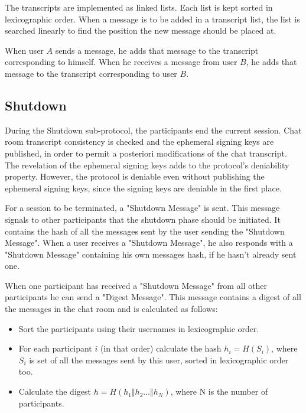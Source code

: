 The transcripts are implemented as linked lists. Each list is kept sorted in lexicographic order.
When a message is to be added in a transcript list, the list is searched linearly to find the position the new message should be placed at.

When user $A$ sends a message, he adds that message to the transcript corresponding to himself.
When he receives a message from user $B$, he adds that message to the transcript corresponding to user $B$.

\subsection{Shutdown}
\label{subsections:shutdown}

\begin{algorithm}[p]
  
\end{algorithm}

During the Shutdown sub-protocol, the participants end the current session. Chat room transcript consistency is checked and the ephemeral signing keys are published, in order to permit a posteriori modifications of the chat transcript. The revelation of the ephemeral signing keys adds to the protocol's deniability property. However, the protocol is deniable even without publishing the ephemeral signing keys, since the signing keys are deniable in the first place.

For a session to be terminated, a "Shutdown Message" is sent. This message signals to other participants that the shutdown phase should be initiated. It contains the  hash of all the messages sent by the user sending the "Shutdown Message". When a user receives a "Shutdown Message", he also responds with a "Shutdown Message" containing his own messages hash, if he hasn't already sent one.

When one participant has received a "Shutdown Message" from all other participants he can send a "Digest Message". This message contains a digest of all the messages in the chat room and is calculated as follows:
\begin{itemize}
  \item[] Sort the participants using their usernames in lexicographic order.
  \item[] For each participant $i$ (in that order) calculate the hash $h_i = H(S_i)$, where $S_i$ is set of all the messages sent by this user, sorted in lexicographic order too.
  \item[] Calculate the digest $h = H(h_1 \Vert h_2 \dots \Vert h_N)$, where N is the number of participants.
\end{itemize}

